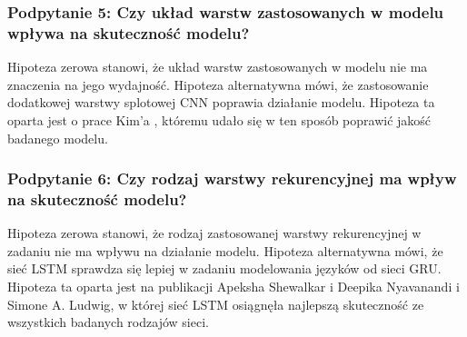 \subsubsection{Podpytanie 5: Czy układ warstw zastosowanych w modelu wpływa na skuteczność modelu?}
Hipoteza zerowa stanowi, że układ warstw zastosowanych w modelu nie ma znaczenia na jego wydajność. Hipoteza alternatywna mówi, że zastosowanie dodatkowej warstwy 
splotowej CNN poprawia działanie modelu. Hipoteza ta oparta jest o prace Kim'a \cite{kim}, któremu udało się w ten sposób poprawić jakość badanego modelu.  
\subsubsection{Podpytanie 6: Czy rodzaj warstwy rekurencyjnej ma wpływ na skuteczność modelu?}
Hipoteza zerowa stanowi, że rodzaj zastosowanej warstwy rekurencyjnej w zadaniu nie ma wpływu na działanie modelu. Hipoteza alternatywna mówi, że sieć LSTM sprawdza 
się lepiej w zadaniu modelowania języków od sieci GRU. Hipoteza ta oparta jest na publikacji Apeksha Shewalkar i Deepika Nyavanandi i Simone A. Ludwig\cite{lstmvsgru}, 
w której sieć LSTM osiągnęła najlepszą skuteczność ze wszystkich badanych rodzajów sieci. 

